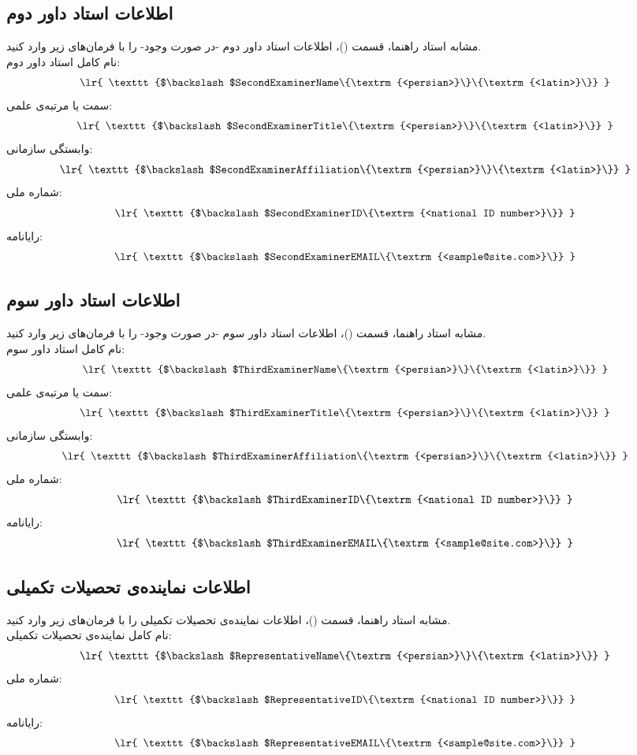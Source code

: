 \documentclass[12pt,a4paper,twoside,fleqn,notitlepage,openany]{extbook}
\begin{document}
\subsection{اطلاعات استاد داور دوم}
مشابه استاد راهنما، قسمت ()، اطلاعات استاد داور دوم -در صورت وجود- را با فرمان‌های زیر وارد کنید\@. \\
نام کامل استاد داور دوم:
\[ \textrm{ \lr{ \texttt{$\backslash$SecondExaminerName\{\textrm{<persian>}\}\{\textrm{<latin>}\}} } } \]
سمت یا مرتبه‌ی علمی:
\[ \textrm{ \lr{ \texttt{$\backslash$SecondExaminerTitle\{\textrm{<persian>}\}\{\textrm{<latin>}\}} } } \]
وابستگی سازمانی:
\[ \textrm{ \lr{ \texttt{$\backslash$SecondExaminerAffiliation\{\textrm{<persian>}\}\{\textrm{<latin>}\}} } } \]
شماره ملی:
\[ \textrm{ \lr{ \texttt{$\backslash$SecondExaminerID\{\textrm{<national ID number>}\}} } } \]
رایانامه:
\[ \textrm{ \lr{ \texttt{$\backslash$SecondExaminerEMAIL\{\textrm{<sample@site.com>}\}} } } \]
\subsection{اطلاعات استاد داور سوم}
مشابه استاد راهنما، قسمت ()، اطلاعات استاد داور سوم -در صورت وجود- را با فرمان‌های زیر وارد کنید\@. \\
نام کامل استاد داور سوم:
\[ \textrm{ \lr{ \texttt{$\backslash$ThirdExaminerName\{\textrm{<persian>}\}\{\textrm{<latin>}\}} } } \]
سمت یا مرتبه‌ی علمی:
\[ \textrm{ \lr{ \texttt{$\backslash$ThirdExaminerTitle\{\textrm{<persian>}\}\{\textrm{<latin>}\}} } } \]
وابستگی سازمانی:
\[ \textrm{ \lr{ \texttt{$\backslash$ThirdExaminerAffiliation\{\textrm{<persian>}\}\{\textrm{<latin>}\}} } } \]
شماره ملی:
\[ \textrm{ \lr{ \texttt{$\backslash$ThirdExaminerID\{\textrm{<national ID number>}\}} } } \]
رایانامه:
\[ \textrm{ \lr{ \texttt{$\backslash$ThirdExaminerEMAIL\{\textrm{<sample@site.com>}\}} } } \]
\subsection{اطلاعات نماینده‌ی تحصیلات تکمیلی}
مشابه استاد راهنما، قسمت ()، اطلاعات نماینده‌ی تحصیلات تکمیلی را با فرمان‌های زیر وارد کنید\@. \\
نام کامل نماینده‌ی تحصیلات تکمیلی:
\[ \textrm{ \lr{ \texttt{$\backslash$RepresentativeName\{\textrm{<persian>}\}\{\textrm{<latin>}\}} } } \]
شماره ملی:
\[ \textrm{ \lr{ \texttt{$\backslash$RepresentativeID\{\textrm{<national ID number>}\}} } } \]
رایانامه:
\[ \textrm{ \lr{ \texttt{$\backslash$RepresentativeEMAIL\{\textrm{<sample@site.com>}\}} } } \]
\end{document}
